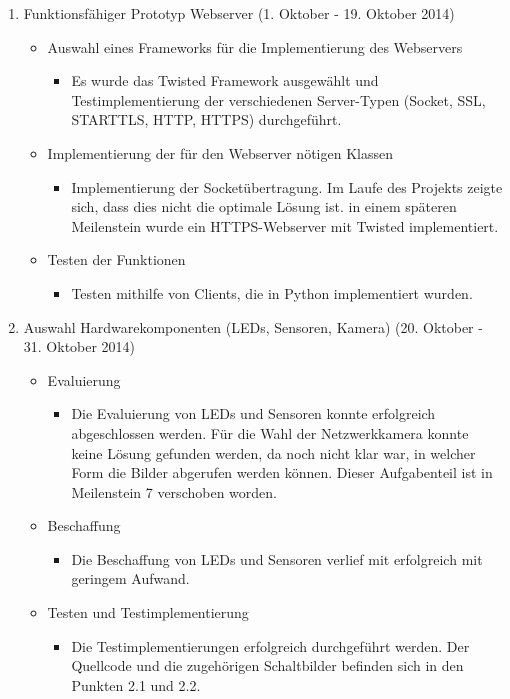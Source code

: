 \begin{enumerate}
\item Funktionsfähiger Prototyp Webserver (1. Oktober - 19. Oktober 2014)
\begin{itemize}
\item Auswahl eines Frameworks für die Implementierung des Webservers
\begin{itemize}
\item Es wurde das Twisted Framework ausgewählt und Testimplementierung der verschiedenen Server-Typen (Socket, SSL, STARTTLS, HTTP, HTTPS) durchgeführt. 
\end{itemize}
\item Implementierung der für den Webserver nötigen Klassen
\begin{itemize}
\item Implementierung der Socketübertragung. Im Laufe des Projekts zeigte sich, dass dies nicht die optimale Lösung ist. in einem späteren Meilenstein wurde ein HTTPS-Webserver mit Twisted implementiert. 
\end{itemize}
\item Testen der Funktionen
\begin{itemize}
\item Testen mithilfe von Clients, die in Python implementiert wurden. 
\end{itemize}
\end{itemize}

\item Auswahl Hardwarekomponenten (LEDs, Sensoren, Kamera) (20. Oktober - 31. Oktober 2014)
\begin{itemize}
\item Evaluierung
\begin{itemize}
\item Die Evaluierung von LEDs und Sensoren konnte erfolgreich abgeschlossen werden. Für die Wahl der Netzwerkkamera konnte keine Lösung gefunden werden, da noch nicht klar war, in welcher Form die Bilder abgerufen werden können. Dieser Aufgabenteil ist in Meilenstein 7 verschoben worden.
\end{itemize} 
\item Beschaffung
\begin{itemize}
\item Die Beschaffung von LEDs und Sensoren verlief mit erfolgreich mit geringem Aufwand. 
\end{itemize}
\item Testen und Testimplementierung
\begin{itemize}
\item Die Testimplementierungen erfolgreich durchgeführt werden. Der Quellcode und die zugehörigen Schaltbilder befinden sich in den Punkten 2.1 und 2.2.
\end{itemize}
\end{itemize}


\end{enumerate}
